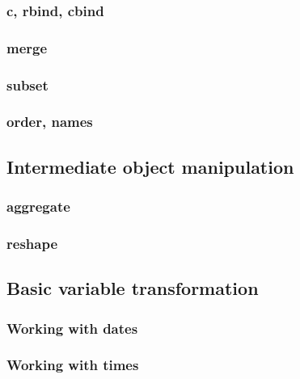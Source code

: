 \documentclass{beamer}
\begin{document}
\begin{frame}[fragile]
    \frametitle{c, rbind, cbind}
    
\end{frame}


\begin{frame}[fragile]
    \frametitle{merge}
    
\end{frame}


\begin{frame}[fragile]
    \frametitle{subset}
    
\end{frame}


\begin{frame}[fragile]
    \frametitle{order, names}
    
\end{frame}


\subsection{Intermediate object manipulation}

\begin{frame}[fragile]
    \frametitle{aggregate}
    
\end{frame}


\begin{frame}[fragile]
    \frametitle{reshape}
    
\end{frame}


\subsection{Basic variable transformation}

\begin{frame}[fragile]
    \frametitle{Working with dates}
    
\end{frame}


\begin{frame}[fragile]
    \frametitle{Working with times}
    
\end{frame}
\end{document}
